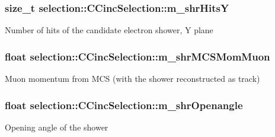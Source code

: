 \subsubsection[{\texorpdfstring{m\+\_\+shr\+HitsY}{m_shrHitsY}}]{\setlength{\rightskip}{0pt plus 5cm}size\+\_\+t selection\+::\+C\+Cinc\+Selection\+::m\+\_\+shr\+HitsY\hspace{0.3cm}{\ttfamily [private]}}\hypertarget{classselection_1_1CCincSelection_aebe42543b0965cce015eb2a8412c33d4}{}\label{classselection_1_1CCincSelection_aebe42543b0965cce015eb2a8412c33d4}
Number of hits of the candidate electron shower, Y plane 
\subsubsection[{\texorpdfstring{m\+\_\+shr\+M\+C\+S\+Mom\+Muon}{m_shrMCSMomMuon}}]{\setlength{\rightskip}{0pt plus 5cm}float selection\+::\+C\+Cinc\+Selection\+::m\+\_\+shr\+M\+C\+S\+Mom\+Muon\hspace{0.3cm}{\ttfamily [private]}}\hypertarget{classselection_1_1CCincSelection_a752b664543c799d4afd1ee195091ff1c}{}\label{classselection_1_1CCincSelection_a752b664543c799d4afd1ee195091ff1c}
Muon momentum from M\+CS (with the shower reconstructed as track) 
\subsubsection[{\texorpdfstring{m\+\_\+shr\+Openangle}{m_shrOpenangle}}]{\setlength{\rightskip}{0pt plus 5cm}float selection\+::\+C\+Cinc\+Selection\+::m\+\_\+shr\+Openangle\hspace{0.3cm}{\ttfamily [private]}}\hypertarget{classselection_1_1CCincSelection_ab64b76c5254ccd50d06ffed8ec5e9eeb}{}\label{classselection_1_1CCincSelection_ab64b76c5254ccd50d06ffed8ec5e9eeb}
Opening angle of the shower 
